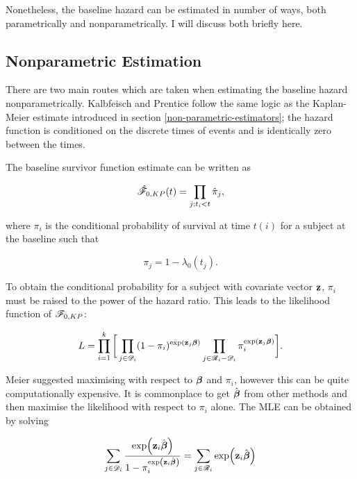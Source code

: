 Nonetheless, the baseline hazard can be estimated in number of ways, both parametrically and nonparametrically. I will discuss both briefly here. 

\subsection{Nonparametric Estimation}

There are two main routes which are taken when estimating the baseline hazard nonparametrically. Kalbfeisch and Prentice  follow the same logic as the Kaplan-Meier estimate introduced in section \ref{non-parametric-estimators}; the hazard function is conditioned on the discrete times of events and is identically zero between the times. 

The baseline survivor function estimate can be written as

\begin{equation}
    \hat{\mathscr{F}}_{0,KP}(t)=\prod_{j;t_i<t}\hat{\pi}_j,
\end{equation}

where $\pi_i$ is the conditional probability of survival at time $t(i)$ for a subject at the baseline such that

\begin{equation}
    \pi_j = 1 - \lambda_0(t_j).
\end{equation}

To obtain the conditional probability for a subject with covariate vector $\textbf{z}$, $\pi_i$ must be raised to the power of the hazard ratio. This leads to the likelihood function of $\mathscr{F}_{0,KP}$:

\begin{equation}\label{MLE-KP}
    L = \prod_{i=1}^k\bigg[\prod_{j\in\mathscr{D}_i}(1-\pi_i)^{\exp(\textbf{z}_j\boldsymbol{\beta})} \prod_{j\in\mathscr{R}_i-\mathscr{D}_i}\pi_i^{\exp(\textbf{z}_j\boldsymbol{\beta})}\bigg].
\end{equation}

Meier suggested maximising  with respect to $\boldsymbol{\beta}$ and $\pi_i$, however this can be quite computationally expensive. It is commonplace to get $\hat{\boldsymbol{\beta}}$ from other methods and then maximise the likelihood with respect to $\pi_i$ alone. The MLE can be obtained by solving

\begin{equation}\label{MLE-KP-max}
    \sum_{j\in\mathscr{D}_i} \frac{\exp(\textbf{z}_i\hat{\boldsymbol{\beta}})}{1-\pi_i^{\exp(\textbf{z}_i\hat{\boldsymbol{\beta}})}} = \sum_{j\in\mathscr{R}_i}\exp(\textbf{z}_i\hat{\boldsymbol{\beta}})
\end{equation}

